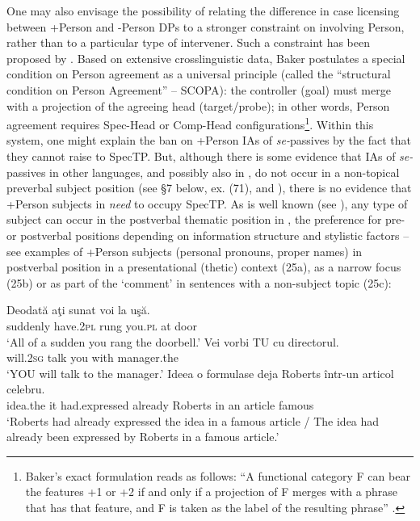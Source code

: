 \documentclass[output=paper]{langsci/langscibook}
\begin{document}
One may also envisage the possibility of relating the difference in case licensing between +Person and -Person DPs to a stronger constraint on  involving Person, rather than to a particular type of intervener. Such a constraint has been proposed by \citet{Baker2008}. Based on extensive crosslinguistic data, Baker postulates a special condition on Person agreement as a universal principle (called the ``structural condition on Person Agreement'' – SCOPA): the controller (goal) must merge with a projection of the agreeing head (target\slash\linebreak probe); in other words, Person agreement requires Spec-Head or Comp-Head configurations\footnote{Baker’s exact formulation reads as follows: “A functional category F can bear the features +1 or +2 if and only if a projection of F merges with a phrase that has that feature, and F is taken as the label of the resulting phrase” \citep[52]{Baker2008}.}. Within this system, one might explain the ban on +Person IAs of \textit{se-}passives by the fact that they cannot raise to SpecTP. But, although there is some evidence that IAs of \textit{se-}passives in other  languages, and possibly also in , do not occur in a non-topical preverbal subject position (see §7 below, ex. (71), and \citealt{Raposo1996,Cornilescu1998,Dobrovie-Sorin2006}), there is no evidence that +Person subjects in  \textit{need} to occupy SpecTP. As is well known (see \citealt{Dobrovie-Sorin1987,Dobrovie-Sorin1994,Cornilescu1997,Alboiu2002}), any type of subject can occur in the postverbal thematic position in , the preference for pre- or postverbal positions depending on information structure and stylistic factors – see examples of +Person subjects (personal pronouns, proper names) in postverbal position in a presentational (thetic) context (25a), as a narrow focus (25b) or as part of the ‘comment' in sentences with a non-subject topic (25c):

\ea%
    \label{ex:giurgea:25}
    \ea
    \gll Deodată   aţi           sunat   voi     la  uşă.  \\
          suddenly have.\textsc{2pl}  rung   you.\textsc{pl}   at door\\
    \glt ‘All of a sudden you rang the doorbell.’
    \ex
    \gll Vei        vorbi TU  cu    directorul.         \\
         will.\textsc{2sg} talk    you with manager.the\\
    \glt ‘YOU will talk to the manager.’
    \ex
    \gll Ideea    o formulase         deja      Roberts într-un articol celebru. \\
         idea.the it had.expressed already Roberts  {in  an} article  famous    \\
    \glt ‘Roberts had already expressed the idea in a famous article / The idea had already been expressed by Roberts in a famous article.’
    \z
\z       
\end{document}
